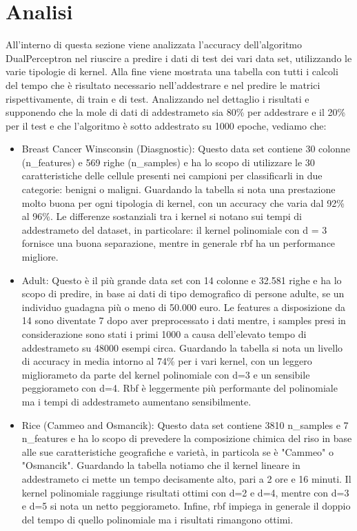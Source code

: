 \documentclass{article}
\begin{document}
	\section{Analisi}
	All'interno di questa sezione viene analizzata l'accuracy dell'algoritmo DualPerceptron nel riuscire a predire i dati di test dei vari data set, utilizzando le varie tipologie di kernel. Alla fine viene mostrata una tabella con tutti i calcoli del tempo che è risultato necessario nell'addestrare e nel predire le matrici rispettivamente, di train e di test.  
	Analizzando nel dettaglio i risultati e supponendo che la mole di dati di addestrameto sia 80\% per addestrare e il 20\% per il test e che l'algoritmo è sotto addestrato su 1000 epoche, vediamo che:
	\begin{itemize}
		\item Breast Cancer Winsconsin (Diasgnostic): Questo data set contiene 30 colonne (n\_features) e 569 righe (n\_samples) e ha lo scopo di utilizzare le 30 caratteristiche delle cellule presenti nei campioni per classificarli in due categorie: benigni o maligni. Guardando la tabella si nota una prestazione molto buona per ogni tipologia di kernel, con un accuracy che varia dal 92\% al 96\%. Le differenze sostanziali tra i kernel si notano sui tempi di addestrameto del dataset, in particolare: il kernel polinomiale con d = 3 fornisce una buona separazione, mentre in generale rbf ha un performance migliore. 
		\item Adult: Questo è il più grande data set con 14 colonne e 32.581 righe e ha lo scopo di predire, in base ai dati di tipo demografico di persone adulte, se un individuo guadagna più o meno di 50.000 euro. Le features a disposizione da 14 sono diventate 7 dopo aver preprocessato i dati mentre, i samples presi in considerazione sono stati i primi 1000 a causa dell'elevato tempo di addestrameto su 48000 esempi circa. Guardando la tabella si nota un livello di accuracy in media intorno al 74\% per i vari kernel, con un leggero migliorameto da parte del kernel polinomiale con d=3 e un sensibile peggiorameto con d=4. Rbf è leggermente più performante del polinomiale ma i tempi di addestrameto aumentano sensibilmente.
		\item Rice (Cammeo and Osmancik): Questo data set contiene 3810 n\_samples e 7 n\_features e ha lo scopo di prevedere la composizione chimica del riso in base alle sue caratteristiche geografiche e varietà, in particola se è "Cammeo" o "Osmancik". Guardando la tabella notiamo che il kernel lineare in addestrameto ci mette un tempo decisamente alto, pari a 2 ore e 16 minuti. Il kernel polinomiale raggiunge risultati ottimi con d=2 e d=4, mentre con d=3 e d=5 si nota un netto peggiorameto. Infine, rbf impiega in generale il doppio del tempo di quello polinomiale ma i risultati rimangono ottimi.

\end{itemize}
\end{document}
